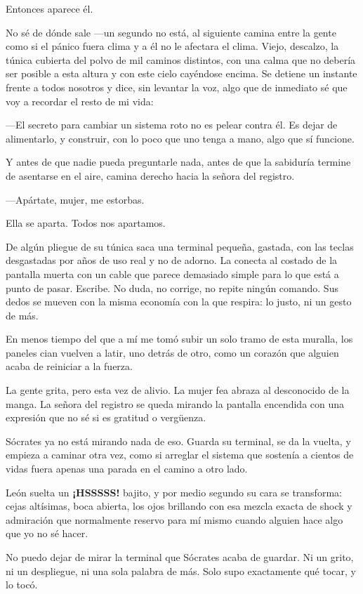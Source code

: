 Entonces aparece él.

No sé de dónde sale —un segundo no está, al siguiente camina entre la gente como si el pánico fuera clima y a él no le afectara el clima. Viejo, descalzo, la túnica cubierta del polvo de mil caminos distintos, con una calma que no debería ser posible a esta altura y con este cielo cayéndose encima. Se detiene un instante frente a todos nosotros y dice, sin levantar la voz, algo que de inmediato sé que voy a recordar el resto de mi vida:

—El secreto para cambiar un sistema roto no es pelear contra él. Es dejar de alimentarlo, y construir, con lo poco que uno tenga a mano, algo que sí funcione.

Y antes de que nadie pueda preguntarle nada, antes de que la sabiduría termine de asentarse en el aire, camina derecho hacia la señora del registro.

—Apártate, mujer, me estorbas.

Ella se aparta. Todos nos apartamos.

De algún pliegue de su túnica saca una terminal pequeña, gastada, con las teclas desgastadas por años de uso real y no de adorno. La conecta al costado de la pantalla muerta con un cable que parece demasiado simple para lo que está a punto de pasar. Escribe. No duda, no corrige, no repite ningún comando. Sus dedos se mueven con la misma economía con la que respira: lo justo, ni un gesto de más.

En menos tiempo del que a mí me tomó subir un solo tramo de esta muralla, los paneles cian vuelven a latir, uno detrás de otro, como un corazón que alguien acaba de reiniciar a la fuerza.

La gente grita, pero esta vez de alivio. La mujer fea abraza al desconocido de la manga. La señora del registro se queda mirando la pantalla encendida con una expresión que no sé si es gratitud o vergüenza.

Sócrates ya no está mirando nada de eso. Guarda su terminal, se da la vuelta, y empieza a caminar otra vez, como si arreglar el sistema que sostenía a cientos de vidas fuera apenas una parada en el camino a otro lado.

León suelta un \textbf{¡HSSSSS!} bajito, y por medio segundo su cara se transforma: cejas altísimas, boca abierta, los ojos brillando con esa mezcla exacta de shock y admiración que normalmente reservo para mí mismo cuando alguien hace algo que yo no sé hacer.

No puedo dejar de mirar la terminal que Sócrates acaba de guardar. Ni un grito, ni un despliegue, ni una sola palabra de más. Solo supo exactamente qué tocar, y lo tocó.

